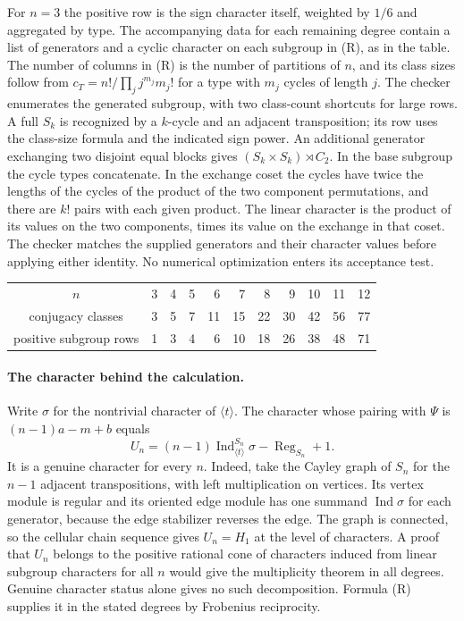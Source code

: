 For $n=3$ the positive row is the sign character itself, weighted
by $1/6$ and aggregated by type. The accompanying data for each
remaining degree contain a list of generators and a cyclic character
on each subgroup in (R), as in the table. The number of columns in
(R) is the number of partitions of $n$, and its class sizes follow
from $c_T=n!/\prod_{j} j^{m_j}m_j!$ for a type with $m_j$ cycles
of length $j$. The checker enumerates the generated subgroup, with two class-count
shortcuts for large rows. A full $S_k$ is recognized by a $k$-cycle
and an adjacent transposition; its row uses the class-size formula and
the indicated sign power. An additional generator exchanging two
disjoint equal blocks gives $(S_k\times S_k)\rtimes C_2$. In the
base subgroup the cycle types concatenate. In the exchange coset the
cycles have twice the lengths of the cycles of the product of the
two component permutations, and there are $k!$ pairs with each
given product. The linear character is the product of its values on
the two components, times its value on the exchange in that coset.
The checker matches the supplied generators and their character values
before applying either identity. No numerical optimization enters its
acceptance test.

\begin{center}\small
\begin{tabular}{c|rrrrrrrrrr}
$n$&3&4&5&6&7&8&9&10&11&12\\
conjugacy classes&3&5&7&11&15&22&30&42&56&77\\
positive subgroup rows&1&3&4&6&10&18&26&38&48&71
\end{tabular}
\end{center}

\paragraph{The character behind the calculation.}
Write $\sigma$ for the nontrivial character of $\langle t\rangle$.
The character whose pairing with $\Psi$ is
$(n-1)a-m+b$ equals
\[
 U_n=(n-1)\operatorname{Ind}_{\langle t\rangle}^{S_n}\sigma
                   -\operatorname{Reg}_{S_n}+1.
\]
It is a genuine character for every $n$. Indeed, take the Cayley graph
of $S_n$ for the $n-1$ adjacent transpositions, with left multiplication
on vertices. Its vertex module is regular and its oriented edge module
has one summand $\operatorname{Ind}\sigma$ for each generator, because
the edge stabilizer reverses the edge. The graph is connected, so the
cellular chain sequence gives $U_n=H_1$ at the level of characters.
A proof that $U_n$ belongs to the positive rational cone of characters
induced from linear subgroup characters for all $n$ would give the
multiplicity theorem in all degrees. Genuine character status alone
gives no such decomposition. Formula (R) supplies it in the stated
degrees by Frobenius reciprocity.

